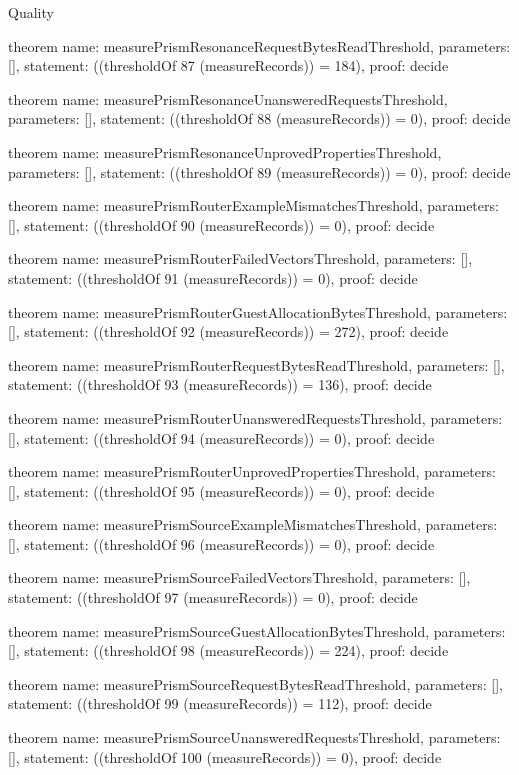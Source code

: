 \begin{lexlean}{Quality}
\begin{semanticmodule}
theorem{
  name: measurePrismResonanceRequestBytesReadThreshold,
  parameters: [],
  statement: ((thresholdOf 87 (measureRecords)) = 184),
  proof: decide{}
}

theorem{
  name: measurePrismResonanceUnansweredRequestsThreshold,
  parameters: [],
  statement: ((thresholdOf 88 (measureRecords)) = 0),
  proof: decide{}
}

theorem{
  name: measurePrismResonanceUnprovedPropertiesThreshold,
  parameters: [],
  statement: ((thresholdOf 89 (measureRecords)) = 0),
  proof: decide{}
}

theorem{
  name: measurePrismRouterExampleMismatchesThreshold,
  parameters: [],
  statement: ((thresholdOf 90 (measureRecords)) = 0),
  proof: decide{}
}

theorem{
  name: measurePrismRouterFailedVectorsThreshold,
  parameters: [],
  statement: ((thresholdOf 91 (measureRecords)) = 0),
  proof: decide{}
}

theorem{
  name: measurePrismRouterGuestAllocationBytesThreshold,
  parameters: [],
  statement: ((thresholdOf 92 (measureRecords)) = 272),
  proof: decide{}
}

theorem{
  name: measurePrismRouterRequestBytesReadThreshold,
  parameters: [],
  statement: ((thresholdOf 93 (measureRecords)) = 136),
  proof: decide{}
}

theorem{
  name: measurePrismRouterUnansweredRequestsThreshold,
  parameters: [],
  statement: ((thresholdOf 94 (measureRecords)) = 0),
  proof: decide{}
}

theorem{
  name: measurePrismRouterUnprovedPropertiesThreshold,
  parameters: [],
  statement: ((thresholdOf 95 (measureRecords)) = 0),
  proof: decide{}
}

theorem{
  name: measurePrismSourceExampleMismatchesThreshold,
  parameters: [],
  statement: ((thresholdOf 96 (measureRecords)) = 0),
  proof: decide{}
}

theorem{
  name: measurePrismSourceFailedVectorsThreshold,
  parameters: [],
  statement: ((thresholdOf 97 (measureRecords)) = 0),
  proof: decide{}
}

theorem{
  name: measurePrismSourceGuestAllocationBytesThreshold,
  parameters: [],
  statement: ((thresholdOf 98 (measureRecords)) = 224),
  proof: decide{}
}

theorem{
  name: measurePrismSourceRequestBytesReadThreshold,
  parameters: [],
  statement: ((thresholdOf 99 (measureRecords)) = 112),
  proof: decide{}
}

theorem{
  name: measurePrismSourceUnansweredRequestsThreshold,
  parameters: [],
  statement: ((thresholdOf 100 (measureRecords)) = 0),
  proof: decide{}
}


\end{semanticmodule}
\end{lexlean}

